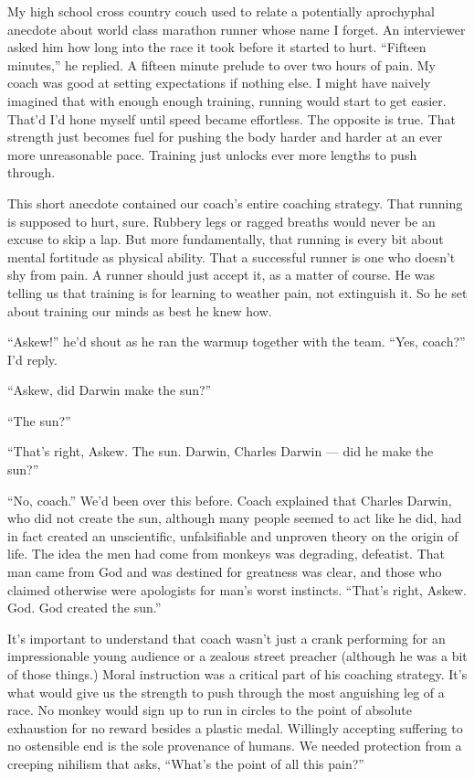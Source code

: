 \documentclass[14pt, oneside]{memoir}
\begin{document}
My high school cross country couch used to relate a potentially
aprochyphal anecdote about world class marathon runner whose name I
forget.
An interviewer asked him how long into the race it took before it
started to hurt.
``Fifteen minutes,'' he replied.
A fifteen minute prelude to over two hours of pain.
My coach was good at setting expectations if nothing else.
I might have naively imagined that with enough enough training,
running would start to get easier.
That'd I'd hone myself until speed became effortless.
The opposite is true.
That strength just becomes fuel for pushing the body harder and harder
at an ever more unreasonable pace.
Training just unlocks ever more lengths to push through.

This short anecdote contained our coach's entire coaching strategy.
That running is supposed to hurt, sure.
Rubbery legs or ragged breaths would never be an excuse to skip a lap.
But more fundamentally, that running is every bit about mental
fortitude as physical ability.
That a successful runner is one who doesn't shy from pain.
A runner should just accept it, as a matter of course.
He was telling us that training is for learning to weather pain, not
extinguish it.
So he set about training our minds as best he knew how.

``Askew!'' he'd shout as he ran the warmup together with the team.
``Yes, coach?'' I'd reply.

``Askew, did Darwin make the sun?''

``The sun?''

``That's right, Askew. The sun. Darwin, Charles Darwin --- did he make
the sun?''

``No, coach.'' We'd been over this before.
Coach explained that Charles Darwin, who did not create the sun,
although many people seemed to act like he did, had in fact created an
unscientific, unfalsifiable and unproven theory on the origin of life.
The idea the men had come from monkeys was degrading, defeatist.
That man came from God and was destined for greatness was clear, and
those who claimed otherwise were apologists for man's worst instincts.
``That's right, Askew. God. God created the sun.''

It's important to understand that coach wasn't just a crank performing
for an impressionable young audience or a zealous street preacher
(although he was a bit of those things.)
Moral instruction was a critical part of his coaching strategy.
It's what would give us the strength to push through the most
anguishing leg of a race.
No monkey would sign up to run in circles to the point of absolute
exhaustion for no reward besides a plastic medal.
Willingly accepting suffering to no ostensible end is the sole
provenance of humans.
We needed protection from a creeping nihilism that asks, ``What's the
point of all this pain?''
\end{document}
